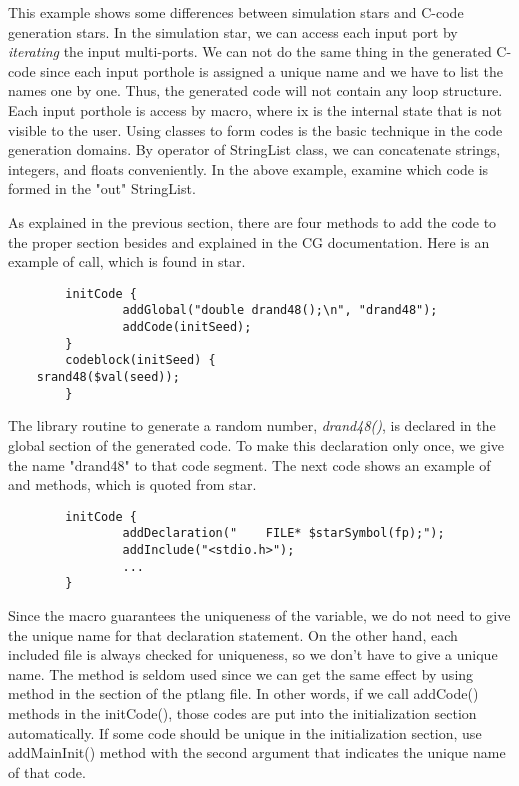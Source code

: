 This example shows some differences between simulation stars and 
C-code generation stars. In the simulation star, we can access
each input port by \emph{iterating} the input multi-ports. We can not
do the same thing in the generated C-code since each input porthole
is assigned a unique name and we have to list the names one by one.
Thus, the generated code will not contain any loop structure.
Each input porthole is access by 
macro, where ix is the internal state that is not visible to the
user. Using 
classes to form codes is the basic technique in the code generation domains.
By 
operator of StringList class, we can concatenate strings, integers,
and floats conveniently. In the above example, examine
which code is formed in the "out" StringList.

As explained in the previous section, there are four methods to add
the code to the proper section besides 
and 
explained in the CG documentation.
Here is an example of 
call, which is found in 
star.

\begin{verbatim}
        initCode {
                addGlobal("double drand48();\n", "drand48");
                addCode(initSeed);
        }
        codeblock(initSeed) {
    srand48($val(seed));
        }
\end{verbatim}

The library routine to generate a random number, \emph{drand48()},
is declared in the global section of the generated code. To
make this declaration only once, we give the name "drand48" to
that code segment. The next code shows an example of 
and 
methods, which is quoted from 
star.

\begin{verbatim}
        initCode {
                addDeclaration("    FILE* $starSymbol(fp);");
                addInclude("<stdio.h>");
                ...
        }
\end{verbatim}

Since the
macro guarantees the uniqueness of the variable, we do not need to
give the unique name for that declaration statement. On the other
hand, each included file is always checked for uniqueness, so we don't
have to give a unique name. The 
method is seldom used since we can get the same effect by using
method in the 
section of the ptlang file. In other words, if we call addCode()
methods in the initCode(), those codes  are put into the
initialization section automatically. If some code should be unique
in the initialization section, use addMainInit() method with the
second argument that indicates the unique name of that code.


